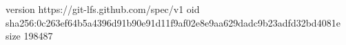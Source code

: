 version https://git-lfs.github.com/spec/v1
oid sha256:0c263ef64b5a4396d91b90e91d11f9af02e8e9aa629dadc9b23adfd32bd4081e
size 198487
